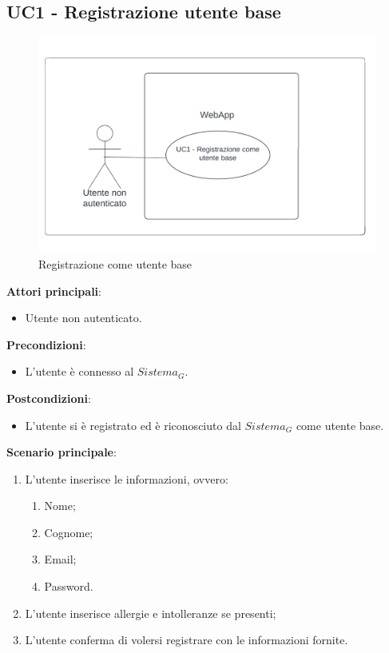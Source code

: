 \subsection{UC1 - Registrazione utente base}\label{usecase:1}
\begin{figure}[H]
  \centering
  \includegraphics[width=0.9\linewidth]{ucd/UCD1_corretto.png}
\caption{Registrazione come utente base}
\end{figure}
\textbf{Attori principali}: 
\begin{itemize}
    \item Utente non autenticato.
\end{itemize}
\textbf{Precondizioni}:
\begin{itemize}
    \item L'utente è connesso al $\textit{Sistema}_G$.
\end{itemize}
\textbf{Postcondizioni}: 
\begin{itemize}
    \item L'utente si è registrato ed è riconosciuto dal $\textit{Sistema}_G$ come utente base.
\end{itemize}
\textbf{Scenario principale}:
\begin{enumerate}
    \item L'utente inserisce le informazioni, ovvero:
    \begin{enumerate}
        \item Nome;
        \item Cognome;
        \item Email;
        \item Password.
    \end{enumerate}
    \item L'utente inserisce allergie e intolleranze se presenti;
    \item L'utente conferma di volersi registrare con le informazioni fornite.
\end{enumerate}
